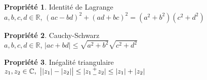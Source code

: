 \documentclass[fleqn]{article}
\theoremstyle{definition} \newtheorem*{defi}{D\'efinition}
\theoremstyle{definition} \newtheorem*{theo}{Th\'eor\`eme}
\theoremstyle{definition} \newtheorem*{coro}{Corollaire}
\theoremstyle{remark} \newtheorem*{rqs}{Remarques}
\theoremstyle{definition} \newtheorem*{prop}{Propri\'et\'e}
\newcommand*{\bfrac}[2]{\genfrac{}{}{0pt}{}{#1}{#2}}
\begin{document}
\begin{prop} Identit\'e de Lagrange \\
	$a,b,c,d \in \mathbb{R}$, $(ac - bd)^2 + (ad + bc)^2 = (a^2 + b^2)(c^2 + d^2)$
\end{prop}

\begin{prop} Cauchy-Schwarz \\
	$a,b,c,d \in \mathbb{R}$, $|ac + bd| \leq \sqrt{a^2 + b^2} \sqrt{c^2 + d^2}$
\end{prop}

\begin{prop} In\'egalit\'e triangulaire \\
	$z_1, z_2 \in \mathbb{C},\ \big||z_1| - |z_2|\big| \leq |z_1 \bfrac{+}{-} z_2| \leq |z_1| + |z_2|$
\end{prop}
\end{document}
